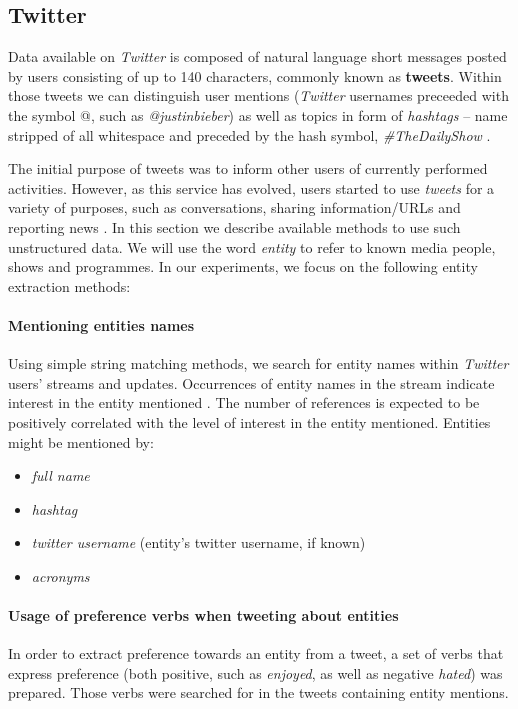 \subsection{Twitter}

Data available on \textit{Twitter} is composed of natural language short messages posted by users
consisting of up to 140 characters, commonly known as \textbf{tweets}. Within
those tweets we can distinguish user mentions (\textit{Twitter} usernames preceeded with the symbol @,
such as \textit{@justinbieber}) as well as topics in form of \textit{hashtags} -- name stripped of all whitespace
and preceded by the hash symbol, \eg \textit{\#TheDailyShow} \cite{edinburg-corpus}.

The initial purpose of tweets was to inform other users of currently performed activities. However, as this service has
evolved, users started to use \textit{tweets} for a variety of purposes, such as conversations,
sharing information/URLs and reporting news \cite{why-we-twitter, twitter-content-is-it}. In this section we describe available methods to use such unstructured data. We will use the word \textit{entity} to refer to
known media people, shows and programmes.
In our experiments, we focus on the following entity extraction methods:

\paragraph{Mentioning entities names}
Using simple string matching methods, we search for entity names within \textit{Twitter} users' streams and updates.
Occurrences of entity names in the stream indicate interest in the entity mentioned \cite{twitter-content-is-it}. The
number of references is expected to be positively correlated with the level of interest in the entity mentioned.
Entities might be mentioned by:
\begin{itemize}
  \item \textit{full name}
  \item \textit{hashtag}
  \item \textit{twitter username} (entity's twitter username, if known)
  \item \textit{acronyms}
\end{itemize}
\paragraph{Usage of preference verbs when tweeting about entities}
In order to extract preference towards an entity from a tweet, a set of verbs
that express preference (both positive, such as \textit{enjoyed}, as well as negative \textit{hated})
was prepared. Those verbs were searched for in the tweets containing entity mentions.
